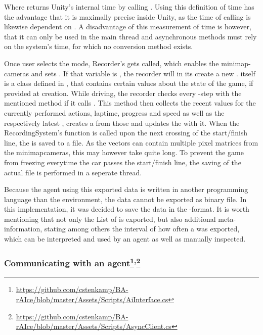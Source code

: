 Where  returns Unity's internal time by calling . Using this definition of time has the advantage that it is maximally precise inside Unity, as the time of calling  is likewise dependent on . A disadvantage of this measurement of time is however, that it can only be used in the main thread and asynchronous methods must rely on the system's time, for which no conversion method exists.

Once user selects the  mode, Recorder's  gets called, which enables the minimap-cameras and sets . If that variable is , the recorder will in its  create a new .  itself is a class defined in , that contains certain values about the state of the game, if provided at creation. While driving, the recorder checks every -step with the mentioned method if it calls . This method then collects the recent values for the currently performed actions, laptime, progress and speed as well as the respectively latest , creates a  from those and updates the  with it. When the RecordingSystem's  function is called upon the next crossing of the start/finish line, the  is saved to a file. As the vectors can contain multiple pixel matrices from the minimapcameras, this may however take quite long. To prevent the game from freezing everytime the car passes the start/finish line, the saving of the actual file is performed in a seperate thread.

Because the agent using this exported data is written in another programming language than the environment, the data cannot be exported as binary file. In this implementation, it was decided to save the data in the -format. It is worth mentioning that not only the List of  is exported, but also additional meta-information, stating among others the interval of how often a  was exported, which can be interpreted and used by an agent as well as manually inspected.

\subsubsection{Communicating with an agent\footnote{\url{https://github.com/cstenkamp/BA-rAIce/blob/master/Assets/Scripts/AiInterface.cs}}\textsuperscript{,}\footnote{\label{footnoteAiInt}\url{https://github.com/cstenkamp/BA-rAIce/blob/master/Assets/Scripts/AsyncClient.cs}}}

